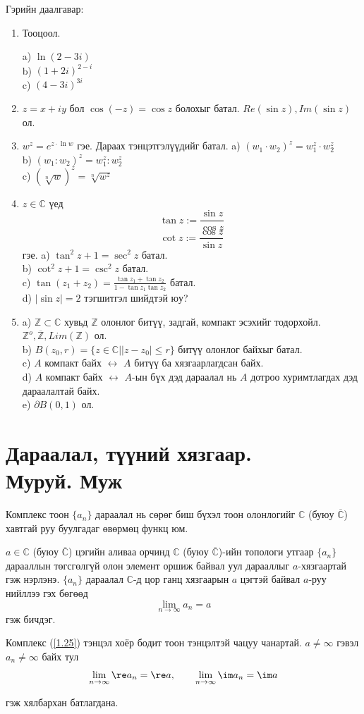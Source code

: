 Гэрийн даалгавар:


\begin{enumerate}
    \item Тооцоол.

a) $\ln(2-3i)$\\
b) $(1+2i)^{2-i}$\\
c) $(4-3i)^{3i}$
\item
$z=x+iy$ бол $\cos(-z)=\cos z$  болохыг батал. $Re(\sin z) , Im(\sin z)$ ол.
\item
$w^z=e^{z\cdot\ln w}$ гэе. Дараах тэнцэтгэлүүдийг батал.
a) $(w_1\cdot w_2)^z=w_1^z\cdot w_2^z$\\
b) $(w_1:w_2)^z=w_1^z:w_2^z$\\
c) $(\sqrt[n]{w})^z=\sqrt[n]{w^z}$
\item
$z\in\mathbb{C}$ үед
$$\tan z:=\frac{\sin z}{\cos z}$$
$$\cot z:=\frac{\cos z}{\sin z}$$ гэе.
a) $\tan^2 z+1=\sec^2 z$ батал.\\
b) $\cot^2 z+1=\csc^2 z$ батал.\\
c) $\tan(z_1+z_2)=\frac{\tan z_1+\tan z_2}{1-\tan z_1\tan z_2}$ батал.\\
d) $|\sin z|=2$ тэгшитгэл шийдтэй юу?
\item
a) $\mathbb{Z}\subset\mathbb{C}$ хувьд $\mathbb{Z}$ олонлог битүү, задгай, компакт эсэхийг тодорхойл. $\mathbb{Z}^{o}, \overline{\mathbb{Z}} , Lim(\mathbb{Z})$ ол.\\
b) $B(z_0,r)=\{z\in\mathbb{C}| |z-z_0|\leq r\}$ битүү олонлог байхыг батал.\\
c) $A$ компакт байх $\longleftrightarrow$ $A$ битүү ба хязгаарлагдсан байх.\\
d) $A$ компакт байх $\longleftrightarrow$ $A$-ын бүх дэд дараалал нь $A$ дотроо хуримтлагдах дэд дараалалтай байх.\\
e) $\partial B(0,1)$ ол.
\end{enumerate}
\section{Дараалал, түүний хязгаар.  \\
Муруй. Муж}

Комплекс тоон $\{a_n\}$ дараалал нь сөрөг биш бүхэл тоон олонлогийг $\mathbb{C}$ (буюу $\overline{\mathbb{C}}$) хавтгай руу буулгадаг өвөрмөц функц юм. 
\begin{dfn}
$a\in\mathbb{C}$ (буюу $\overline{\mathbb{C}}$) цэгийн аливаа орчинд $\mathbb{C}$ (буюу  $\overline{\mathbb{C}}$)-ийн топологи утгаар $\{a_n\}$ дарааллын төгсгөлгүй олон элемент оршиж байвал уул дарааллыг $a$-хязгаартай гэж нэрлэнэ. $\{a_n\}$ дараалал $\mathbb{C}$-д цор ганц хязгаарын $a$ цэгтэй байвал $a$-руу нийллээ гэх бөгөөд
\begin{equation} \label{1.25}
\lim_{n\rightarrow \infty} a_n=a 
\end{equation}
гэж бичдэг.

Комплекс (\ref{1.25}) тэнцэл хоёр бодит тоон тэнцэлтэй чацуу чанартай. $a\neq \infty$ гэвэл $a_n\neq \infty$ байх тул
$$\lim_{n\rightarrow \infty} \re a_n=\re a, \qquad \lim_{n\rightarrow \infty} \im a_n=\im a$$
\end{dfn}
гэж хялбархан батлагдана.

